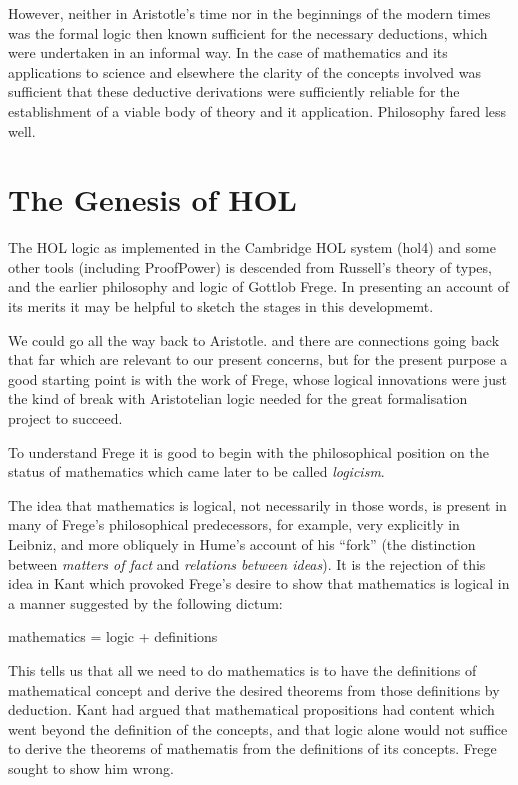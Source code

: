 \documentclass[10pt,titlepage]{book}
\begin{document}
However, neither in Aristotle's time nor in the beginnings of the modern times was the formal logic then known sufficient for the necessary deductions, which were undertaken in an informal way.
In the case of mathematics and its applications to science and elsewhere the clarity of the concepts involved was sufficient that these deductive derivations were sufficiently reliable for the establishment of a viable body of theory and it application.
Philosophy fared less well.

\section{The Genesis of HOL}

The HOL logic as implemented in the Cambridge HOL system (hol4) and some other tools (including ProofPower) is descended from Russell's theory of types, and the earlier philosophy and logic of Gottlob Frege.
In presenting an account of its merits it may be helpful to sketch the stages in this developmemt.

We could go all the way back to Aristotle. and there are connections going back that far which are relevant to our present concerns, but for the present purpose a good starting point is with the work of Frege, whose logical innovations were just the kind of break with Aristotelian logic needed for the great formalisation project to succeed.

To understand Frege it is good to begin with the philosophical position on the status of mathematics which came later to be called {\it logicism}.

The idea that mathematics is logical, not necessarily in those words, is present in many of Frege's philosophical predecessors, for example, very explicitly in Leibniz, and more obliquely in Hume's account of his ``fork'' (the distinction between {\it matters of fact} and {\it relations between ideas}).
It is the rejection of this idea in Kant which provoked Frege's desire to show that mathematics is logical in a manner suggested by the following dictum:

{\large
\begin{centering}
  mathematics = logic + definitions
\end{centering}
}

This tells us that all we need to do mathematics is to have the definitions of mathematical concept and derive the desired theorems from those definitions by deduction.
Kant had argued that mathematical propositions had content which went beyond the definition of the concepts, and that logic alone would not suffice to derive the theorems of mathematis from the definitions of its concepts.
Frege sought to show him wrong.
\end{document}
